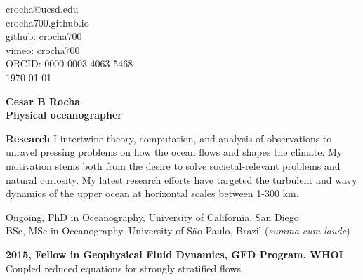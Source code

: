 \documentclass[a4paper,11pt,final]{memoir}
\newcommand{\Sep}{\vspace{1.25em}}
\newcommand{\SmallSep}{\vspace{0.5em}}
\newenvironment{Research}
    {\ignorespaces\textbf{\color{NavyBlue} Research}}
\newcommand{\CVSection}[1]
    {\Large\textbf{#1}\par
    \SmallSep\normalsize\normalfont}
\newcommand{\CVItem}[1]
    {\textbf{\color{NavyBlue} #1}}
\begin{document}
%

\begin{flushright}\small
    crocha@ucsd.edu\\[.1cm]
    crocha700.github.io\\[.1cm]
    github: crocha700\\[.1cm]
    vimeo: crocha700\\[.1cm]
    ORCID: 0000-0003-4063-5468\\[.1cm]
    \textcolor[gray]{0.45}{\mydate\today}\\[.1cm]
\end{flushright}\normalsize
\framebreak

\Huge\bfseries { \color{NavyBlue}  Cesar B Rocha} \\
\Large\bfseries Physical oceanographer \\

\normalsize\normalfont

\begin{Research}
I intertwine theory, computation, and analysis of
observations to unravel pressing problems
on how the ocean flows and shapes the climate.
My motivation
stems both from the desire to solve societal-relevant
problems and natural curiosity.
 My latest research efforts have
targeted the turbulent and wavy dynamics of the upper ocean at horizontal scales between 1-300 km.

\end{Research}

\Sep


Ongoing, PhD in Oceanography, University of California, San Diego \\
BSc, MSc in Oceanography, University of S\~ao Paulo, Brazil (\textit{summa cum laude}) \\

\Sep


\CVItem{2015, Fellow in Geophysical Fluid Dynamics, GFD Program, WHOI}\\
Coupled reduced equations for strongly stratified flows.
\SmallSep
\end{document}
